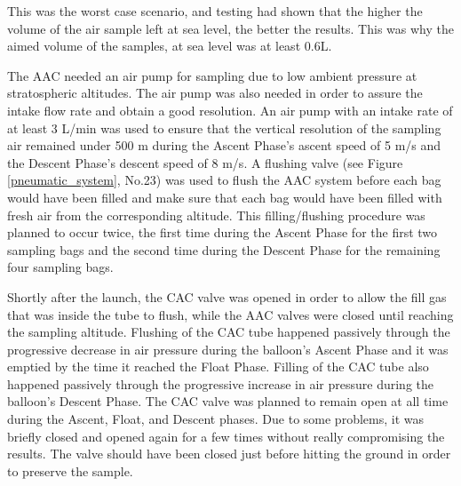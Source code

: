 This was the worst case scenario, and testing had shown that the higher the volume of the air sample left at sea level, the better the results. This was why the aimed volume of the samples, at sea level was at least 0.6L. 




The AAC needed an air pump for sampling due to low ambient pressure at stratospheric altitudes. The air pump was also needed in order to assure the intake flow rate and obtain a good resolution. An air pump with an intake rate of at least 3 L/min was used to ensure that the vertical resolution of the sampling air remained under 500 m during the Ascent Phase's ascent speed of 5 m/s and the  Descent Phase's descent speed of 8 m/s. A flushing valve (see Figure \ref{pneumatic_system}, No.23) was used to flush the AAC system before each bag would have been filled and make sure that each bag would have been filled with fresh air from the corresponding altitude. This filling/flushing procedure was planned to occur twice, the first time during the Ascent Phase for the first two sampling bags and the second time during the Descent Phase for the remaining four sampling bags.

Shortly after the launch, the CAC valve was opened in order to allow the fill gas that was inside the tube to flush, while the AAC valves were closed until reaching the sampling altitude. Flushing of the CAC tube happened passively through the progressive decrease in air pressure during the balloon's Ascent Phase and it was emptied by the time it reached the Float Phase. Filling of the CAC tube also happened passively through the progressive increase in air pressure during the balloon's Descent Phase. The CAC valve was planned to  remain open at all time during the Ascent, Float, and Descent phases. Due to some problems, it was briefly closed and opened again for a few times without really compromising the results.  The valve should have been closed just before hitting the ground in order to preserve the sample. 

